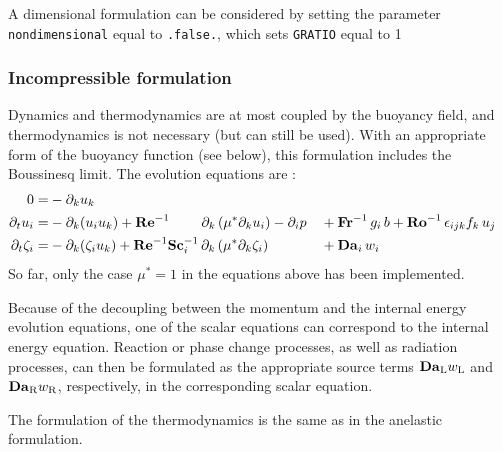 A dimensional formulation can be considered by setting the parameter \texttt{nondimensional} equal to \texttt{.false.}, which sets \texttt{GRATIO} equal to 1

\subsubsection{Incompressible formulation}

Dynamics and thermodynamics are at most coupled by the buoyancy field, and thermodynamics is not necessary (but can still be used). With an appropriate form of the buoyancy function (see below), this formulation includes the Boussinesq limit. The evolution equations are :
\begin{subequations}
    \begin{align}
        0                   =& -\partial_k u_k                                          \\
        \partial_t  u_i     =& -\partial_k ( u_i u_k )  
        +\mathrm{\bf Re}^{-1}\qquad\;\partial_k \left( \mu^{*} \partial_k u_i\right)  -\partial_i p&&
        +\mathrm{\bf Fr}^{-1}\, g_i\,b +\mathrm{\bf Ro}^{-1}\,\epsilon_{ijk} f_k\,u_j  \\
        \partial_t \zeta_i  =& -\partial_k (\zeta_i u_k)                    
        +\mathrm{\bf Re}^{-1}\mathrm{\bf Sc}_i^{-1}\, \partial_k \left( \mu^{*}\partial_k\zeta_i\right) &&+ \mathrm{\bf Da}_i\,w_i
    \end{align}
\end{subequations}
So far, only the case $\mu^*=1$ in the equations above has been implemented.

Because of the decoupling between the momentum and the internal energy evolution equations, one of the scalar equations can correspond to the internal energy equation. Reaction or phase change processes, as well as radiation processes, can then be formulated as the appropriate source terms $\mathrm{\bf   Da}_\mathrm{L}w_\mathrm{L}$ and $\mathrm{\bf Da}_\mathrm{R}w_\mathrm{R}$, respectively, in the corresponding scalar equation. %

The formulation of the thermodynamics is the same as in the anelastic formulation.


